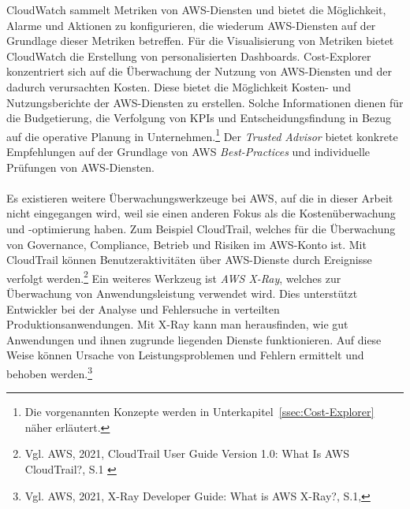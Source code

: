 CloudWatch sammelt Metriken von AWS-Diensten und bietet die Möglichkeit, Alarme und Aktionen zu konfigurieren, die wiederum AWS-Diensten auf der Grundlage dieser Metriken betreffen. Für die Visualisierung von Metriken bietet CloudWatch die Erstellung von personalisierten Dashboards.
Cost-Explorer konzentriert sich auf die Überwachung der Nutzung von AWS-Diensten und der dadurch verursachten Kosten. Diese bietet die Möglichkeit Kosten- und Nutzungsberichte der AWS-Diensten zu erstellen. Solche Informationen dienen für die Budgetierung, %
die Verfolgung von KPIs und Entscheidungsfindung in Bezug auf die operative Planung in Unternehmen.\footnote{Die vorgenannten Konzepte werden in Unterkapitel~\ref{ssec:Cost-Explorer} näher erläutert.} %
Der \textit{Trusted Advisor} bietet konkrete Empfehlungen auf der Grundlage von AWS \textit{Best-Practices} und individuelle Prüfungen von AWS-Diensten.
\\\\
Es existieren weitere Überwachungswerkzeuge bei AWS, auf die in dieser Arbeit nicht eingegangen wird, weil sie einen anderen Fokus als die Kostenüberwachung und -optimierung haben. Zum Beispiel CloudTrail, welches für die Überwachung von Governance, Compliance, Betrieb und Risiken im AWS-Konto ist. Mit CloudTrail können Benutzeraktivitäten über AWS-Dienste durch Ereignisse verfolgt werden.\footnote{Vgl. AWS, 2021, CloudTrail User Guide Version 1.0: What Is AWS CloudTrail?, S.1 \cite{AMZ27}} Ein weiteres Werkzeug ist \textit{AWS X-Ray}, welches zur Überwachung von Anwendungsleistung verwendet wird. Dies unterstützt Entwickler bei der Analyse und Fehlersuche in verteilten Produktionsanwendungen. Mit X-Ray kann man herausfinden, wie gut Anwendungen und ihnen zugrunde liegenden Dienste funktionieren. Auf diese Weise können Ursache von Leistungsproblemen und Fehlern ermittelt und behoben werden.\footnote{Vgl. AWS, 2021, X-Ray Developer Guide: What is AWS X-Ray?, S.1\cite{AMZ27},}
\newpage

